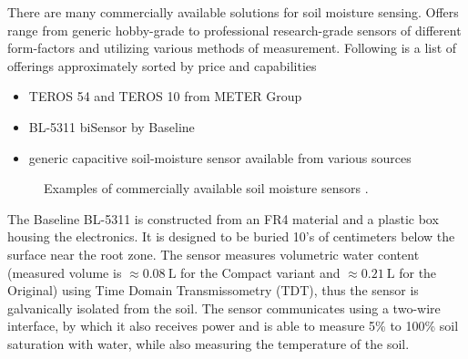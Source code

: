 
There are many commercially available solutions for soil moisture sensing. Offers range from generic hobby-grade to professional research-grade sensors of different form-factors and utilizing various methods of measurement. Following is a list of offerings approximately sorted by price and capabilities
\begin{itemize}
    \item TEROS 54 and TEROS 10 from METER Group \cite{meter_group_teros_2024, meter_group_teros_nodate}
    \item BL-5311 biSensor by Baseline \cite{baseline_soil_2021}
    \item generic capacitive soil-moisture sensor available from various sources \cite{czechproject_spol_sro_pudni_2024}
\end{itemize}

\begin{figure}[H]
    \centering
    \caption{\label{fig:soil-sensors}Examples of commercially available soil moisture sensors \cite{meter_group_teros_nodate, baseline_soil_2021, czechproject_spol_sro_pudni_2024}.}
\end{figure}

The Baseline BL-5311 is constructed from an FR4 material and a plastic box housing the electronics. It is designed to be buried 10's of centimeters below the surface near the root zone. The sensor measures volumetric water content (measured volume is $\approx 0.08~\mathrm{L}$ for the Compact variant and $\approx 0.21~\mathrm{L}$ for the Original) using Time Domain Transmissometry (TDT), thus the sensor is galvanically isolated from the soil. The sensor communicates using a two-wire interface, by which it also receives power and is able to measure 5\% to 100\% soil saturation with water, while also measuring the temperature of the soil.

